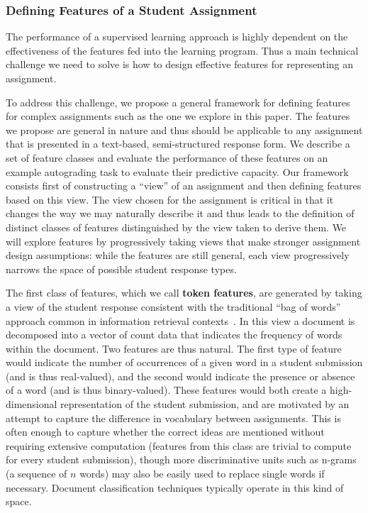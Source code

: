 \subsubsection{Defining Features of a Student Assignment}

The performance of a supervised learning approach is highly dependent on 
the effectiveness of the features fed into the learning program. Thus a main technical 
challenge we need to solve is how to design effective features for representing
an assignment. 

To address this challenge, we propose a general framework for defining features for complex
assignments such as the one we explore in this paper. The features we
propose are general in nature and thus should be applicable to any
assignment that is presented in a text-based, semi-structured response
form. We describe a set of feature classes and evaluate the performance of
these features on an example autograding task to evaluate their predictive
capacity. Our framework consists first of constructing a ``view'' of an
assignment and then defining features based on this view. The view chosen
for the assignment is critical in that it changes the way we may naturally
describe it and thus leads to the definition of distinct classes of
features distinguished by the view taken to derive them. We will explore
features by progressively taking views that make stronger assignment design
assumptions: while the features are still general, each view progressively
narrows the space of possible student response types.

The first class of features, which we call \textbf{token features}, are
generated by taking a view of the student response consistent with the
traditional ``bag of words'' approach common in information retrieval
contexts~\cite{Salton:1975:VSM}. In this view a document is decomposed into
a vector of count data that indicates the frequency of words within the
document. Two features are thus natural. The first type of feature would
indicate the number of occurrences of a given word in a student submission
(and is thus real-valued), and the second would indicate the presence or
absence of a word (and is thus binary-valued). These features would both
create a high-dimensional representation of the student submission, and are
motivated by an attempt to capture the difference in vocabulary between
assignments. This is often enough to capture whether the correct ideas are
mentioned without requiring extensive computation (features from this class
are trivial to compute for every student submission), though more discriminative
units such as n-grams (a sequence of $n$ words) may also be easily used
to replace single words if necessary.  Document
classification techniques typically operate in this kind of space.

